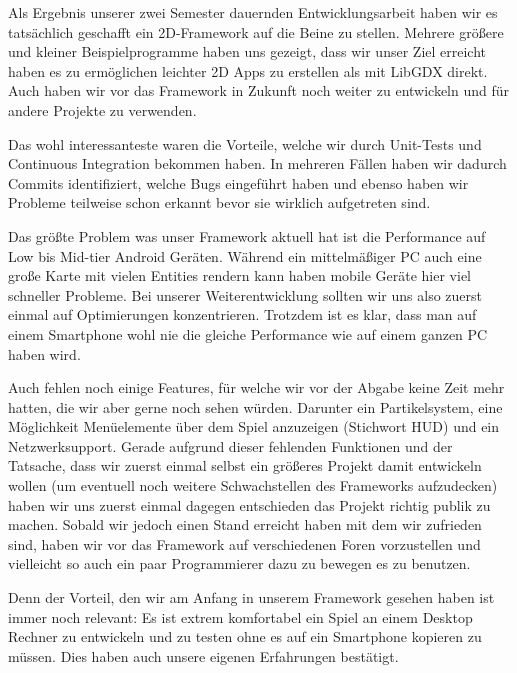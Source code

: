 Als Ergebnis unserer zwei Semester dauernden Entwicklungsarbeit haben wir es tatsächlich geschafft ein 2D-Framework auf die Beine zu stellen.
Mehrere größere und kleiner Beispielprogramme haben uns gezeigt, dass wir unser Ziel erreicht haben es zu ermöglichen leichter 2D Apps zu erstellen als mit LibGDX direkt.
Auch haben wir vor das Framework in Zukunft noch weiter zu entwickeln und für andere Projekte zu verwenden.

Das wohl interessanteste waren die Vorteile, welche wir durch Unit-Tests und Continuous Integration bekommen haben. In mehreren Fällen haben wir dadurch Commits identifiziert, welche Bugs eingeführt haben und ebenso haben wir Probleme teilweise schon erkannt bevor sie wirklich aufgetreten sind.

Das größte Problem was unser Framework aktuell hat ist die Performance auf Low bis Mid-tier Android Geräten. Während ein mittelmäßiger PC auch eine große Karte mit vielen Entities rendern kann haben mobile Geräte hier viel schneller Probleme. Bei unserer Weiterentwicklung sollten wir uns also zuerst einmal auf Optimierungen konzentrieren. Trotzdem ist es klar, dass man auf einem Smartphone wohl nie die gleiche Performance wie auf einem ganzen PC haben wird.

Auch fehlen noch einige Features, für welche wir vor der Abgabe keine Zeit mehr hatten, die wir aber gerne noch sehen würden. Darunter ein Partikelsystem, eine Möglichkeit Menüelemente über dem Spiel anzuzeigen (Stichwort HUD) und ein Netzwerksupport. Gerade aufgrund dieser fehlenden Funktionen und der Tatsache, dass wir zuerst einmal selbst ein größeres Projekt damit entwickeln wollen (um eventuell noch weitere Schwachstellen des Frameworks aufzudecken) haben wir uns zuerst einmal dagegen entschieden das Projekt richtig publik zu machen. 
Sobald wir jedoch einen Stand erreicht haben mit dem wir zufrieden sind, haben wir vor das Framework auf verschiedenen Foren vorzustellen und vielleicht so auch ein paar Programmierer dazu zu bewegen es zu benutzen.

Denn der Vorteil, den wir am Anfang in unserem Framework gesehen haben ist immer noch relevant: Es ist extrem komfortabel ein Spiel an einem Desktop Rechner zu entwickeln und zu testen ohne es auf ein Smartphone kopieren zu müssen. Dies haben auch unsere eigenen Erfahrungen bestätigt. 

